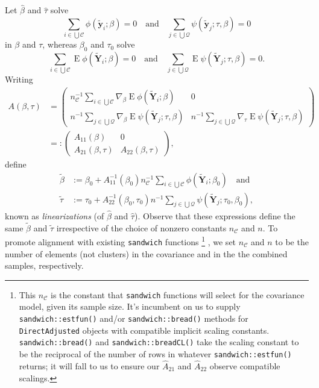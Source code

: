 \documentclass{article}
\newcommand{\EE}{\operatorname{E}}
\begin{document}
Let $\hat\beta$ and $\hat\tau$ solve
\[\sum_{i\in \bigcup \mathcal{C}}\phi(\tilde{\mathbf{y}}_{i}; \beta )
  =0\quad\text{and}\quad
\sum_{j\in \bigcup \mathcal{Q}}\psi(\tilde{\mathbf{y}}_{j}; \tau, \beta )  =0
  \]
  in $\beta$ and $\tau$, whereas $\beta_{0}$ and $\tau_{0}$ solve 
\[\sum_{i\in \bigcup \mathcal{C}}\EE\phi(\tilde{\mathbf{Y}}_{i}; \beta )
  =0\quad\text{and}\quad
\sum_{j\in \bigcup \mathcal{Q}}\EE\psi(\tilde{\mathbf{Y}}_{j}; \tau, \beta )  =0.
  \]
  Writing
  \begin{align*}
    A(\beta, \tau) &= \left(
      \begin{array}{cc}
        n_{\mathcal{C}}^{-1}\sum_{i\in \bigcup
        \mathcal{C}}\nabla_{\beta}\EE \phi(\tilde{\mathbf{Y}}_{i};
        \beta )&0\\
        n^{-1}\sum_{j\in \bigcup
        \mathcal{Q}}\nabla_{\beta}\EE\psi(\tilde{\mathbf{Y}}_{j};
        \tau, \beta )  & n^{-1}\sum_{j\in \bigcup
        \mathcal{Q}}\nabla_{\tau}\EE\psi(\tilde{\mathbf{Y}}_{j};
        \tau, \beta )
      \end{array}
    \right)\\
    &=:\left(
      \begin{array}{cc}
        A_{11}(\beta)& 0\\
        A_{21}(\beta, \tau) & A_{22}(\beta, \tau)
      \end{array}
\right),
  \end{align*}
  define 
  \begin{align*}
   \tilde\beta &:= \beta_{0} + A_{11}^{-1}(\beta_{0})n_{\mathcal{C}}^{-1}\sum_{i\in \bigcup \mathcal{C}}\phi(\tilde{\mathbf{Y}}_{i}; \beta_{0})
  \quad \text{and}\\
\tilde\tau &:=\tau_{0} + A_{22}^{-1}(\beta_{0}, \tau_{0})n^{-1}\sum_{j\in \bigcup \mathcal{Q}}\psi(\tilde{\mathbf{Y}}_{j}; \tau_{0},
\beta_{0} ),
\end{align*}
known as \textit{linearizations} (of $\hat\beta$ and $\hat\tau$).
Observe that these expressions define the same $\tilde\beta$ and $\tilde\tau$
  irrespective of the choice of nonzero constants $n_{\mathcal{C}}$
  and $n$.  To promote alignment with existing \texttt{sandwich}
  functions%
  \footnote{%
    This $n_{\mathcal{C}}$ is the constant that \texttt{sandwich} functions
will select for the covariance model, given its sample size.  It's
incumbent on us to supply \texttt{sandwich::estfun()} and/or
\texttt{sandwich::bread()} methods for \texttt{DirectAdjusted} objects
with compatible implicit
scaling constants. \texttt{sandwich::bread()} and
\texttt{sandwich::breadCL()} take the scaling constant to be the
reciprocal of the number of rows in whatever
\texttt{sandwich::estfun()} returns; it will fall to us to ensure our
$\hat{A}_{21}$ and $\hat{A}_{22}$ observe compatible scalings.}%
, we set $n_{\mathcal{C}}$ and $n$ to be the number of elements
(not clusters) in the covariance and in the the combined samples,
respectively.
\end{document}
